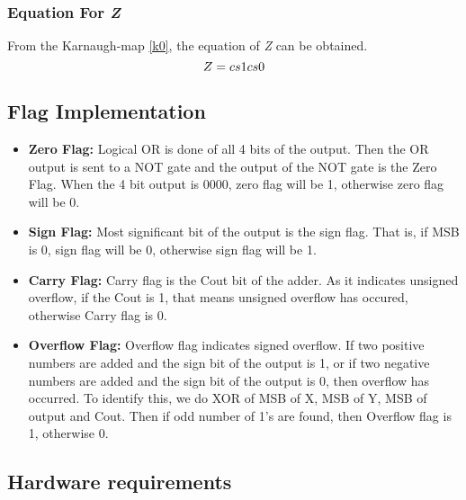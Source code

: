 \documentclass[12pt]{article}
\begin{document}
\subsubsection{Equation For \textit{Z}}

From the Karnaugh-map \ref{k0}, the equation of \textit{Z} can be obtained.
\begin{equation}
    \boldmath Z = cs1cs0
    \label{eq2}
\end{equation}

\subsection{Flag Implementation}

\begin{itemize}


\item[\ding{228}] {\textbf{Zero Flag:} Logical OR is done of all 4 bits of the output. Then the OR output is sent to a NOT gate and the output of the NOT gate is the Zero Flag. When the 4 bit output is 0000, zero flag will be 1, otherwise zero flag will be 0.}

\item[\ding{228}] {\textbf{Sign Flag:} Most significant bit of the output is the sign flag. That is, if MSB is 0, sign flag will be 0, otherwise sign flag will be 1.}

\item[\ding{228}] {\textbf{Carry Flag:} Carry flag is the Cout bit of the adder. As it indicates unsigned overflow, if the Cout is 1, that means unsigned overflow has occured, otherwise Carry flag is 0.}

\item[\ding{228}] {\textbf{Overflow Flag:} Overflow flag indicates signed overflow. If two positive numbers are added and the sign bit of the output is 1, or if two negative numbers are added and the sign bit of the output is 0, then overflow has occurred. To identify this, we do XOR of MSB of X, MSB of Y, MSB of output and Cout. Then if odd number of 1's are found, then Overflow flag is 1, otherwise 0.}

\end{itemize}

\subsection{Hardware requirements}
\end{document}

